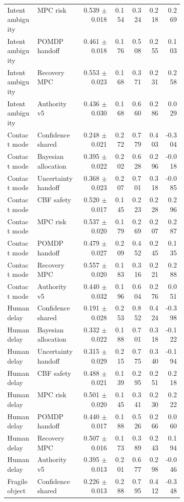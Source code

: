\documentclass{article}
\begin{document}
\begin{center}
\begin{longtable}{p{0.17\linewidth}p{0.25\linewidth}rrrrr}
Intent ambiguity & MPC risk & 0.539 $\pm$ 0.018 & 0.154 & 0.324 & 0.218 & 0.269\\
Intent ambiguity & POMDP handoff & 0.461 $\pm$ 0.018 & 0.176 & 0.508 & 0.255 & 0.103\\
Intent ambiguity & Recovery MPC & 0.553 $\pm$ 0.023 & 0.168 & 0.371 & 0.231 & 0.258\\
Intent ambiguity & Authority v5 & 0.436 $\pm$ 0.030 & 0.168 & 0.660 & 0.286 & 0.029\\
Contact mode & Confidence shared & 0.248 $\pm$ 0.021 & 0.272 & 0.779 & 0.403 & -0.304\\
Contact mode & Bayesian allocation & 0.395 $\pm$ 0.022 & 0.202 & 0.628 & 0.296 & -0.018\\
Contact mode & Uncertainty handoff & 0.368 $\pm$ 0.023 & 0.207 & 0.701 & 0.318 & -0.085\\
Contact mode & CBF safety & 0.520 $\pm$ 0.017 & 0.145 & 0.223 & 0.228 & 0.296\\
Contact mode & MPC risk & 0.537 $\pm$ 0.020 & 0.179 & 0.269 & 0.207 & 0.287\\
Contact mode & POMDP handoff & 0.479 $\pm$ 0.027 & 0.209 & 0.452 & 0.245 & 0.135\\
Contact mode & Recovery MPC & 0.557 $\pm$ 0.020 & 0.183 & 0.316 & 0.221 & 0.288\\
Contact mode & Authority v5 & 0.440 $\pm$ 0.032 & 0.196 & 0.604 & 0.276 & 0.051\\
Human delay & Confidence shared & 0.191 $\pm$ 0.028 & 0.253 & 0.852 & 0.424 & -0.398\\
Human delay & Bayesian allocation & 0.332 $\pm$ 0.022 & 0.188 & 0.701 & 0.318 & -0.122\\
Human delay & Uncertainty handoff & 0.315 $\pm$ 0.029 & 0.215 & 0.775 & 0.340 & -0.194\\
Human delay & CBF safety & 0.488 $\pm$ 0.021 & 0.139 & 0.295 & 0.251 & 0.218\\
Human delay & MPC risk & 0.501 $\pm$ 0.020 & 0.145 & 0.341 & 0.230 & 0.222\\
Human delay & POMDP handoff & 0.440 $\pm$ 0.017 & 0.188 & 0.526 & 0.266 & 0.060\\
Human delay & Recovery MPC & 0.507 $\pm$ 0.016 & 0.173 & 0.389 & 0.243 & 0.194\\
Human delay & Authority v5 & 0.395 $\pm$ 0.013 & 0.201 & 0.677 & 0.298 & -0.046\\
Fragile object & Confidence shared & 0.226 $\pm$ 0.013 & 0.288 & 0.795 & 0.412 & -0.348\\

\end{longtable}
\end{center}
\end{document}
